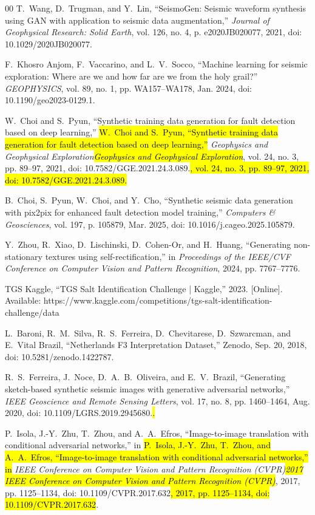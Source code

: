 \documentclass{ieeeaccess}
\DeclareRobustCommand{\DIFaddbegin}{\DIFOaddbegin \let\includegraphics\DIFaddincludegraphics} %
\DeclareRobustCommand{\DIFaddend}{\DIFOaddend \let\includegraphics\DIFOincludegraphics} %
\providecommand{\DIFadd}[1]{{\protect\color{blue}#1}}
\renewcommand{\DIFadd}[1]{\ifmmode#1\else\begingroup\let\protect\relax\hl{#1}\endgroup\fi}
\providecommand{\DIFaddbegin}{}
\providecommand{\DIFaddend}{}
\renewcommand{\DIFaddbegin}{}
\renewcommand{\DIFaddend}{}
\begin{document}
\begin{thebibliography}{00}
T.~Wang, D.~Trugman, and Y.~Lin, ``SeismoGen: Seismic waveform synthesis using GAN with application to seismic data augmentation,'' \emph{Journal of Geophysical Research: Solid Earth}, vol. 126, no. 4, p. e2020JB020077, 2021, doi: 10.1029/2020JB020077.

F.~Khosro Anjom, F.~Vaccarino, and L.~V.~Socco, ``Machine learning for seismic exploration: Where are we and how far are we from the holy grail?'' \emph{GEOPHYSICS}, vol. 89, no. 1, pp. WA157--WA178, Jan. 2024, doi: 10.1190/geo2023-0129.1.

\DIFaddbegin {}
\DIFadd{W.~Choi and S.~Pyun, ``Synthetic training data generation for fault detection based on deep learning,'' }\emph{\DIFadd{Geophysics and Geophysical Exploration}}\DIFadd{, vol. 24, no. 3, pp. 89--97, 2021, doi: 10.7582/GGE.2021.24.3.089.}

\DIFaddend {}
B.~Choi, S.~Pyun, W.~Choi, and Y.~Cho, ``Synthetic seismic data generation with pix2pix for enhanced fault detection model training,'' \emph{Computers \& Geosciences}, vol. 197, p. 105879, Mar. 2025, doi: 10.1016/j.cageo.2025.105879.

Y.~Zhou, R.~Xiao, D.~Lischinski, D.~Cohen-Or, and H.~Huang, ``Generating non-stationary textures using self-rectification,'' in \emph{Proceedings of the IEEE/CVF Conference on Computer Vision and Pattern Recognition}, 2024, pp. 7767--7776.

TGS Kaggle, ``TGS Salt Identification Challenge | Kaggle,'' 2023. [Online]. Available: https://www.kaggle.com/competitions/tgs-salt-identification-challenge/data

L.~Baroni, R.~M.~Silva, R.~S.~Ferreira, D.~Chevitarese, D.~Szwarcman, and E.~Vital Brazil, ``Netherlands F3 Interpretation Dataset,'' Zenodo, Sep. 20, 2018, doi: 10.5281/zenodo.1422787.

R.~S.~Ferreira, J.~Noce, D.~A.~B.~Oliveira, and E.~V.~Brazil, ``Generating sketch-based synthetic seismic images with generative adversarial networks,'' \emph{IEEE Geoscience and Remote Sensing Letters}, vol. 17, no. 8, pp. 1460--1464, Aug. 2020, doi: 10.1109/LGRS.2019.2945680\DIFaddbegin \DIFadd{.}

\DIFadd{P.~Isola, J.-Y.~Zhu, T.~Zhou, and A.~A.~Efros, ``Image-to-image translation with conditional adversarial networks,'' in }\emph{\DIFadd{2017 IEEE Conference on Computer Vision and Pattern Recognition (CVPR)}}\DIFadd{, 2017, pp. 1125--1134, doi: 10.1109/CVPR.2017.632}\DIFaddend .


\end{thebibliography}
\end{document}
